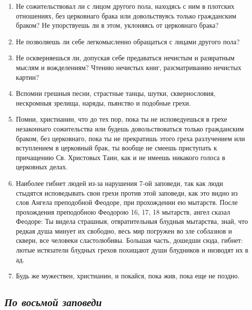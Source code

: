 \begin{enumerate}

\item Не сожительствовал ли с лицом другого пола, находясь с ним в плотских отношениях, без церковнаго брака или довольствуясь только гражданским браком? Не упорствуешь ли в этом, уклоняясь от церковнаго брака?

\item Не позволяешь ли себе легкомысленно обращаться с лицами другого пола?

\item Не оскверняешься ли, допуская себе предаваться нечистым и развратным мыслям и вожделениям? Чтению нечистых книг, разсматриванию нечистых картин?

\item Вспомни грешныя песни, страстные танцы, шутки, сквернословия, нескромныя зрелища, наряды, пьянство и подобные грехи.

\item Помни, христианин, что до тех пор, пока ты не исповедуешься в грехе незаконнаго сожительства или будешь довольствоваться только гражданским браком, без церковнаго, пока ты не прекратишь этого греха разлучением или вступлением в церковный брак, ты вообще не смеешь приступать к причащению Св. Христовых Таин, как и не имеешь никакого голоса в церковных делах.

\item Наиболее гибнет людей из-за нарушения 7-ой заповеди, так как люди стыдятся исповедывать свои грехи против этой заповеди, как это видно из слов Ангела преподобной Феодоре, при прохождении ею мытарств. После прохождения преподобною Феодорою 16, 17, 18 мытарств, ангел сказал Феодоре: Ты видела страшныя, отвратительныя блудныя мытарства, знай, что редкая душа минует их свободно, весь мир погружен во зле соблазнов и скверн, все человеки сластолюбивы. Большая часть, дошедши сюда, гибнет: лютые истязатели блудных грехов похищают души блудников и низводят их в ад.

\item Будь же мужествен, христианин, и покайся, пока жив, пока еще не поздно. 
\end{enumerate}

\subsection*{\itshape По восьмой заповеди}

